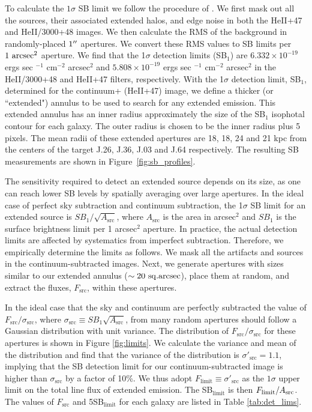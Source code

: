 \documentclass[twocolumn]{aastex61}
\begin{document}
To calculate the $1\sigma$ SB limit we follow the procedure of \cite{Battaia_2015}. We first mask out all the sources, their associated extended halos, and edge noise in both the HeII+47 and HeII/3000+48 images. We then calculate the RMS of the background in randomly-placed $1\mbox{$^{\prime\prime}$}$ apertures. We convert these RMS values to SB limits per $1~\rm arcsec^2$  aperture. We find that the 1$\sigma$ detection limits 
(SB$_1$) are $6.332\times10^{-19}$ ergs sec $^{-1}$ cm$^{-2}$ arcsec$^2$ and $5.808\times10^{-19} $ ergs sec $^{-1}$ cm$^{-2}$ arcsec$^2$ in the HeII/3000+48 and HeII+47 filters, respectively. With the 1$\sigma$ detection limit, SB$_1$, determined for the continuum+ (HeII+47) image, we define a thicker (or ``extended") annulus to be used to search for any extended  emission. This extended annulus has an inner radius approximately the size of the SB$_1$ isophotal contour for each galaxy. The outer radius is chosen to be the inner radius plus 5 pixels. The mean radii of these extended apertures are 18, 18, 24 and 21 kpc from the centers of the target J.26, J.36, J.03 and J.64 respectively. The resulting SB measurements are shown in Figure~\ref{fig:sb_profiles}.

The sensitivity required to detect an extended source depends on its size, as one can reach lower SB levels by spatially averaging over large apertures. In the ideal case of perfect sky subtraction and continuum subtraction, the 1$\sigma$ SB limit for an extended source is $SB_{1}/\sqrt{A_\text{src}}$, where $A_\text{src}$ is the area in arcsec$^2$ and $SB_{1}$ is the surface brightness limit per 1 arcsec$^2$ aperture. In practice, the actual detection limits are affected by systematics from imperfect subtraction. Therefore, we empirically determine the limits as follows. We mask all the artifacts and sources in the continuum-subtracted images. Next, we generate apertures with sizes similar to our extended annulus ($\sim 20 \rm\ sq.arcsec$), place them at random, and extract the fluxes, $F_{\text{src}}$, within these apertures.

 In the ideal case that the sky and continuum are perfectly subtracted the value of $F_{\text{src}}/ \sigma_{\text{src}}$, where $\sigma_{\text{src}} \equiv SB_{1}\sqrt{A_\text{src}}$, from many random apertures should follow a Gaussian distribution with unit variance. The distribution of $F_{\text{src}}/\sigma_{\text{src}}$ for these apertures is shown in Figure \ref{fig:limits}. We calculate the variance and mean of the distribution and find that the variance of the distribution is $\sigma'_{\text{src}}=1.1$, implying that the SB detection limit for our continuum-subtracted image is higher than $\sigma_{\text{src}}$ by a factor of 10\%. We thus adopt $F_{\text{limit}} \equiv \sigma'_{\text{src}}$  as the $1 \sigma$ upper limit on the total line flux of extended  emission. The SB$_{\text{limit}}$ is then $F_{\text{limit}}/A_{\rm{src}}$. The values of $F_{\text{src}}$ and 5SB$_{\text{limit}}$ for each galaxy are listed in Table \ref{tab:det_lims}.
\end{document}
